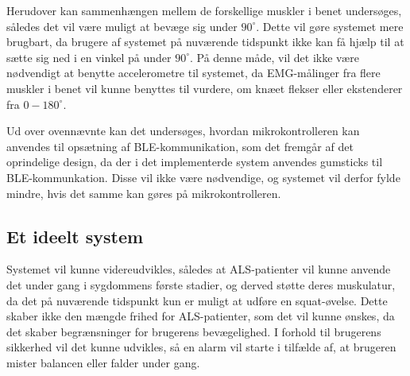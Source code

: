 \noindent
Herudover kan sammenhængen mellem de forskellige muskler i benet undersøges, således det vil være muligt at bevæge sig under $90^{\circ}$. Dette vil gøre systemet mere brugbart, da brugere af systemet på nuværende tidspunkt ikke kan få hjælp til at sætte sig ned i en vinkel på under $90^{\circ}$. På denne måde, vil det ikke være nødvendigt at benytte accelerometre til systemet, da EMG-målinger fra flere muskler i benet vil kunne benyttes til vurdere, om knæet flekser eller ekstenderer fra $0-180^{\circ}$.

Ud over ovennævnte kan det undersøges, hvordan mikrokontrolleren kan anvendes til opsætning af BLE-kommunikation, som det fremgår af det oprindelige design, da der i det implementerde system anvendes gumsticks til BLE-kommunkation. Disse vil ikke være nødvendige, og systemet vil derfor fylde mindre, hvis det samme kan gøres på mikrokontrolleren. 

\subsection{Et ideelt system}
Systemet vil kunne videreudvikles, således at ALS-patienter vil kunne anvende det under gang i sygdommens første stadier, og derved støtte deres muskulatur, da det på nuværende tidspunkt kun er muligt at udføre en squat-øvelse. Dette skaber ikke den mængde frihed for ALS-patienter, som det vil kunne ønskes, da det skaber begrænsninger for brugerens bevægelighed. I forhold til brugerens sikkerhed vil det kunne udvikles, så en alarm vil starte i tilfælde af, at brugeren mister balancen eller falder under gang. 





